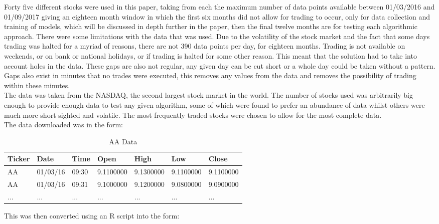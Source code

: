 \documentclass[conference]{IEEEtran}
\begin{document}
Forty five different stocks were used in this paper, taking from each the maximum number of data points available between 01/03/2016 and 01/09/2017 giving an eighteen month window in which the first six months did not allow for trading to occur, only for data collection and training of models, which will be discussed in depth further in the paper, then the final twelve months are for testing each algorithmic approach. There were some limitations with the data that was used. Due to the volatility of the stock market and the fact that some days trading was halted for a myriad of reasons, there are not 390 data points per day, for eighteen months. Trading is not available on weekends, or on bank or national holidays, or if trading is halted for some other reason. This meant that the solution had to take into account holes in the data. These gaps are also not regular, any given day can be cut short or a whole day could be taken without a pattern. Gaps also exist in minutes that no trades were executed, this removes any values from the data and removes the possibility of trading within these minutes.\\

The data was taken from the NASDAQ, the second largest stock market in the world. The number of stocks used was arbitrarily big enough to provide enough data to test any given algorithm, some of which were found to prefer an abundance of data whilst others were much more short sighted and volatile. The most frequently traded stocks were chosen to allow for the most complete data.\\

The data downloaded was in the form:

\begin{table*}
\centering
\label{units}
\begin{tabu}{ |p{1.5cm}|p{1.5cm}|p{1.5cm}|p{2cm}|p{2cm}|p{2cm}|p{2cm}| }\hline\hline
Ticker & Date & Time & Open & High & Low & Close \\ \hline
AA & 01/03/16 & 09:30 & 9.1100000 & 9.1300000 & 9.1100000 & 9.1100000 \\ \hline
AA & 01/03/16 & 09:31 & 9.1000000 & 9.1200000 & 9.0800000 & 9.0900000 \\ \hline
... & ... & ... & ... & ... & ... & ... \\ \hline
\end{tabu}
\vspace{2 mm}
\caption{AA Data}
\end{table*}

This was then converted using an R script into the form:
\end{document}
